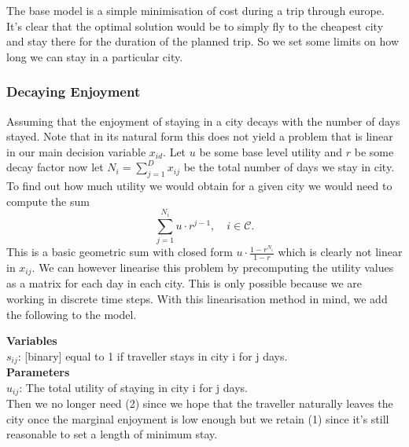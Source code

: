\documentclass[12pt]{article}
\begin{document}
The base model is a simple minimisation of cost during a trip through europe. It's clear that the optimal solution would be to simply fly to the cheapest city and stay there for the duration of the planned trip. So we set some limits on how long we can stay in a particular city.


\newpage
\subsubsection{Decaying Enjoyment}
Assuming that the enjoyment of staying in a city decays with the number of days stayed. Note that in its natural form this does not yield a problem that is linear in our main decision variable $x_{id}$. Let $u$ be some base level utility and $r$ be some decay factor now let $N_i=\sum_{j=1}^D x_{ij}$ be the total number of days we stay in city. To find out how much utility we would obtain for a given city we would need to compute the sum
\begin{equation*}
	\sum\limits_{j=1}^{N_{i}} u \cdot r^{j-1}, \quad i \in \mathcal{C}.
\end{equation*}
This is a basic geometric sum with closed form $u \cdot \frac{1-r^{N_i}}{1-r}$ which is clearly not linear in $x_{ij}$. We can however linearise this problem by precomputing the utility values as a matrix for each day in each city. This is only possible because we are working in discrete time steps. With this linearisation method in mind, we add the following to the model.

\textbf{Variables}\\
$s_{ij}$: [binary] equal to 1 if traveller stays in city i for j days.\\

\textbf{Parameters} \\
$u_{ij}$: The total utility of staying in city i for j days.\\

Then we no longer need (2) since we hope that the traveller naturally leaves the city once the marginal enjoyment is low enough but we retain (1) since it's still reasonable to set a length of minimum stay.
\end{document}
